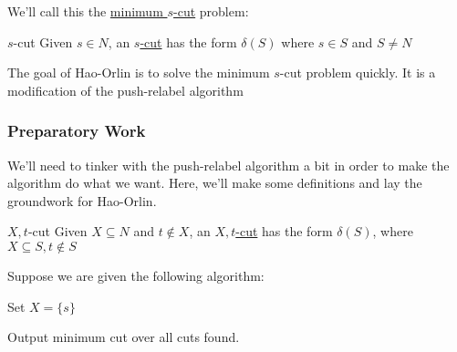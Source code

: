 We'll call this the \underline{minimum $s$-cut} problem:
\begin{definition}{$s$-cut}{}
    Given $s \in N$, an \underline{$s$-cut} has the form $\delta(S)$ where $s \in S$ and $S \neq N$
\end{definition}

The goal of Hao-Orlin is to solve the minimum $s$-cut problem quickly.
It is a modification of the push-relabel algorithm

\subsubsection{Preparatory Work}
We'll need to tinker with the push-relabel algorithm a bit in order to make the algorithm do what we want.
Here, we'll make some definitions and lay the groundwork for Hao-Orlin.

\begin{definition}{$X,t$-cut}{}
    Given $X \subseteq N$ and $t \not\in X$, an \underline{$X,t$-cut} has the form $\delta(S)$, where $X \subseteq S, t \not\in S$

    \begin{minipage}{\textwidth}
        \centering
      \end{minipage}
\end{definition}

Suppose we are given the following algorithm:

\IncMargin{1em}
\begin{algorithm}[H]\label{alg:generic-s-cut}  
    \nl Set $X = \{s\}$
    
    \nl {}
    
    \nl Output minimum cut over all cuts found. 

    \caption{Generic Algorithm for minimum $s$-cut}
\end{algorithm}

